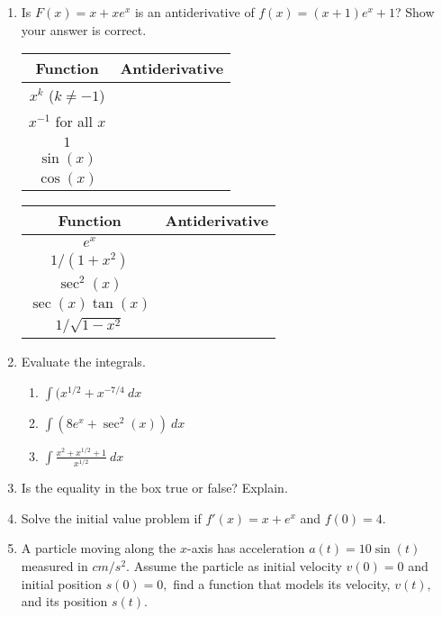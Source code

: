 \documentclass[11pt,fleqn]{article}
\def\ds{\displaystyle}
\begin{document}
\begin{enumerate}
\item Is $F(x)=x+xe^x$ is an antiderivative of $f(x)=(x+1)e^x+1$? Show your answer is correct.
\vfill
\doublespacing
\begin{tabular}{|c|c|}\hline
Function & \quad \quad Antiderivative \quad \quad \quad \\ \hline
$\ds x^k$ ($k\neq -1$) &\\  \hline
$\ds x^{-1}$ for all $x$&\\ \hline
$\ds 1$ &\\ \hline
$\ds \sin(x)$ & \\ \hline
$\ds \cos(x)$ &\\ \hline
\end{tabular}
\quad
\begin{tabular}{|c|c|}\hline
Function & \quad \quad Antiderivative \quad \quad \quad \\ \hline
$\ds e^x$ &\\ \hline
$\ds 1/(1+x^2)$  &\\ \hline
$\ds \sec^2(x)$ &\\ \hline
$\ds \sec(x)\tan(x)$ &\\ \hline
$\ds 1/\sqrt{1-x^2}$ &\\ \hline
\end{tabular}
\singlespacing
\newpage
\item Evaluate the integrals.
	\begin{enumerate}
	\item $\displaystyle{\int( x^{1/2} + x^{-7/4}\: dx}$\\

	\item $\displaystyle{\int( 8e^{x} + \sec^2(x))\: dx}$\\
	\item $\displaystyle{\int \frac{x^2+x^{1/2}+1}{x^{1/2}}\: dx}$
	\vspace{.5in}
	\end{enumerate}
\item Is the equality in the box true or false? Explain. \hfill {}\\
\vspace{.5in}
\item Solve the initial value problem if $f'(x)=x+e^x$ and $f(0)=4.$
\vfill
\item A particle moving along the $x$-axis has acceleration $a(t)=10\sin(t)$ measured in $cm/s^2.$ Assume the particle as initial velocity $v(0)=0$ and initial position $s(0)=0,$ find a function that models its velocity, $v(t),$ and its position $s(t).$
\vfill
\end{enumerate}
\end{document}
